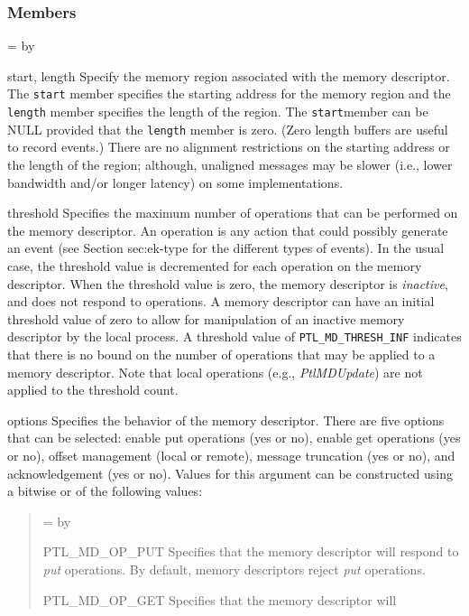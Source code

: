 \documentclass{sand-report}
\newcommand{\retlabel}[1]{\mbox{\texttt{#1}}\hfil}
\newenvironment{returns}%
  {\begin{list}{}%
      {\renewcommand{\makelabel}{\retlabel}%
        \topsep=0.0pt%
        \labelwidth=1.25in%
        \leftmargin=\labelwidth%
        \advance \leftmargin by \labelsep%
        \setlength{\itemsep}{.5\smallskipamount}%
        \setlength{\parsep}{0pt}}%
      }%
  {\end{list}}
\begin{document}
\subsubsection*{Members}
\begin{returns}
\item[start, length] Specify the memory region associated with the
  memory descriptor.  The \texttt{start} member specifies the starting
  address for the memory region and the \texttt{length} member
  specifies the length of the region.  The \texttt{start}member can be
  NULL provided that the \texttt{length} member is zero.  (Zero length
  buffers are useful to record events.)  There are no alignment
  restrictions on the starting address or the length of the region;
  although, unaligned messages may be slower (i.e., lower bandwidth
  and/or longer latency) on some implementations.
\item[threshold] Specifies the maximum number of operations that can
  be performed on the memory descriptor.  An operation is any action
  that could possibly generate an event (see Section {sec:ek-type} for
  the different types of events).  In the usual case, the threshold
  value is decremented for each operation on the memory descriptor.
  When the threshold value is zero, the memory descriptor is
  \emph{inactive}, and does not respond to operations.  A memory
  descriptor can have an initial threshold value of zero to allow for
  manipulation of an inactive memory descriptor by the local process.
  A threshold value of \texttt{PTL_MD_THRESH_INF} indicates that there
  is no bound on the number of operations that may be applied to a
  memory descriptor.  Note that local operations (e.g.,
  \emph{PtlMDUpdate}) are not applied to the threshold count. 
\item[options] Specifies the behavior of the memory descriptor.  There
  are five options that can be selected: enable put operations (yes or
  no), enable get operations (yes or no), offset management (local or
  remote), message truncation (yes or no), and acknowledgement (yes or
  no).  Values for this argument can be constructed using a bitwise or
  of the following values:
  \begin{quote}
    \begin{returns}
    \item[PTL_MD_OP_PUT] Specifies that the memory descriptor will
      respond to \emph{put} operations.  By default, memory
      descriptors reject \emph{put} operations.
    \item[PTL_MD_OP_GET] Specifies that the memory descriptor will

\end{returns}
\end{quote}
\end{returns}
\end{document}
